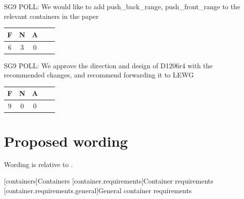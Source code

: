 \documentclass{wg21}
\begin{document}
\begin{quoteblock}
SG9 POLL: We would like to add push_back_range, push_front_range to the relevant containers in the paper

\begin{tabular}{|c|c|c|c|c|}
    \hline
    F & N & A\\
    \hline
    6 & 3 & 0 \\
    \hline
\end{tabular}
\end{quoteblock}

\begin{quoteblock}
SG9 POLL: We approve the direction and design of D1206r4 with the recommended changes, and recommend forwarding it to LEWG

\begin{tabular}{|c|c|c|c|c|}
    \hline
    F & N & A\\
    \hline
    9 & 0 & 0 \\
    \hline
\end{tabular}
\end{quoteblock}


\section{Proposed wording}

Wording is relative to \cite{N4885}.


[containers]{Containers}
[container.requirements]{Container requirements}
[container.requirements.general]{General container requirements}
\end{document}
